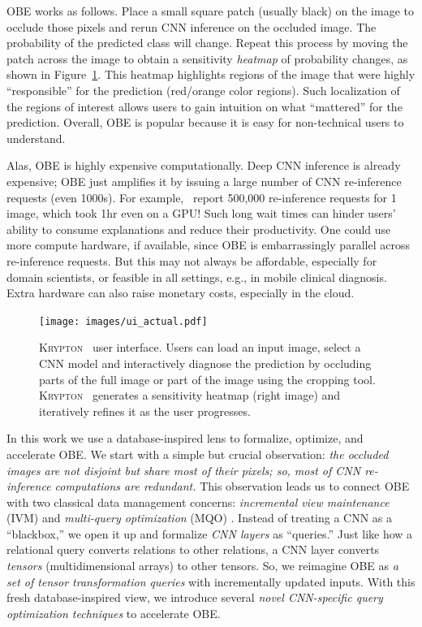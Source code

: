 \documentclass{vldb}
\newcommand{\system}{\textsc{Krypton}}
\begin{document}
OBE works as follows. Place a small square patch (usually black) on the image to occlude those pixels and rerun CNN inference on the occluded image. The probability of the predicted class will change. Repeat this process by moving the patch across the image to obtain a sensitivity \textit{heatmap} of probability changes, as shown in Figure~\ref{img:ui}. This heatmap highlights regions of the image that were highly ``responsible'' for the prediction (red/orange color regions). Such localization of the regions of interest allows users to gain intuition on what ``mattered'' for the prediction.
Overall, OBE is popular because it is easy for non-technical users to understand.

Alas, OBE is highly expensive computationally. Deep CNN inference is already expensive; OBE just amplifies it by issuing a large number of CNN re-inference requests (even 1000s). For example,~\cite{zintgraf2017visualizing} report 500,000 re-inference requests for 1 image, which took 1hr even on a GPU! Such long wait times can hinder users' ability to consume explanations and reduce their productivity. One could use more compute hardware, if available, since OBE is embarrassingly parallel across re-inference requests. But this may not always be affordable, especially for domain scientists, or feasible in all settings, e.g., in mobile clinical diagnosis. Extra hardware can also raise monetary costs, especially in the cloud.


\begin{figure}[t]\label{img:ui}
\texttt{[image: images/ui\_actual.pdf]}
\caption{\system~ user interface. Users can load an input image, select a CNN model and interactively diagnose the prediction by occluding parts of the full image or part of the image using the cropping tool. \system~ generates a sensitivity heatmap (right image) and iteratively refines it as the user progresses.}
\vspace{-2mm}
\end{figure}

In this work we use a database-inspired lens to formalize, optimize, and accelerate OBE. We start with a simple but crucial observation: \textit{the occluded images are not disjoint but share most of their pixels; so, most of CNN re-inference computations are redundant.} This observation leads us to connect OBE with two classical data management concerns: \textit{incremental view maintenance} (IVM) \cite{chirkova2012materialized} and \textit{multi-query optimization} (MQO) \cite{sellis1988multiple}. Instead of treating a CNN as a ``blackbox,'' we open it up and formalize \textit{CNN layers} as ``queries.'' Just like how a relational query converts relations to other relations, a CNN layer converts \textit{tensors} (multidimensional arrays) to other tensors. So, we reimagine OBE as \textit{a set of tensor transformation queries} with incrementally updated inputs. With this fresh database-inspired view, we introduce several \textit{novel CNN-specific query optimization techniques} to accelerate OBE.
\end{document}
